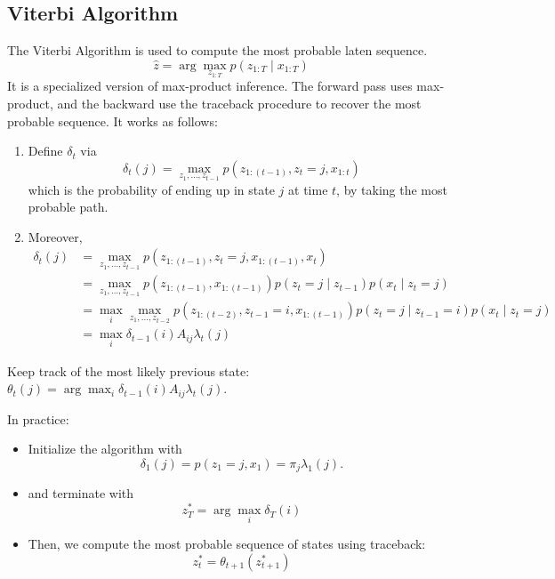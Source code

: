 \subsection{Viterbi Algorithm}
The Viterbi Algorithm is used to compute the most probable laten sequence.
$$\hat{z}=\arg \max _{z_{1: T}} p\left(z_{1: T} \mid x_{1: T}\right)$$
It is a specialized version of max-product inference. The forward pass uses max-product, and the backward use the traceback procedure to recover the most probable sequence. It works as follows:
\begin{enumerate}
    \item Define $\delta_t$ via
    $$
    \delta_t(j)=\max _{z_1, \ldots, z_{t-1}} p\left(z_{1:(t-1)}, z_t=j, x_{1: t}\right)
    $$
    which is the probability of ending up in state $j$ at time $t$, by taking the most probable path.
    \item Moreover,
    $$
    \begin{aligned}
        \delta_t(j) & =\max _{z_1, \ldots, z_{t-1}} p\left(z_{1:(t-1)}, z_t=j, x_{1:(t-1)}, x_t\right) \\
        & =\max _{z_1, \ldots, z_{t-1}} p\left(z_{1:(t-1)}, x_{1:(t-1)}\right) p\left(z_t=j \mid z_{t-1}\right) p\left(x_t \mid z_t=j\right) \\
        & =\max _i \max _{z_1, \ldots, z_{t-2}} p\left(z_{1:(t-2)}, z_{t-1}=i, x_{1:(t-1)}\right) p\left(z_t=j \mid z_{t-1}=i\right) p\left(x_t \mid z_t=j\right) \\
        & =\max _i \delta_{t-1}(i) A_{i j} \lambda_t(j)
    \end{aligned}
    $$
\end{enumerate}
Keep track of the most likely previous state: $\theta_t(j)=\arg \max _i \delta_{t-1}(i) A_{i j} \lambda_t(j)$.

In practice:
\begin{itemize}
    \item Initialize the algorithm with
    $$
    \delta_1(j)=p\left(z_1=j, x_1\right)=\pi_j \lambda_1(j) .
    $$
    \item and terminate with
    $$
    z_T^*=\arg \max _i \delta_T(i)
    $$
    \item Then, we compute the most probable sequence of states using traceback:
    $$
    z_t^*=\theta_{t+1}\left(z_{t+1}^*\right)
    $$
\end{itemize}